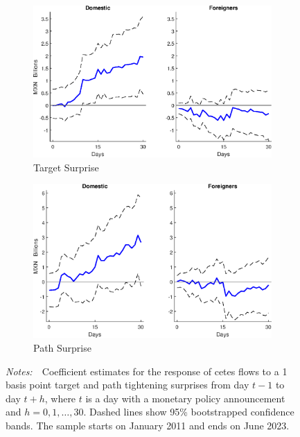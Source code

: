 \documentclass[a4paper, 12pt]{article}
\newcommand{\figtext}[1]{
	\vspace{-1ex}
	\captionsetup{justification=justified,font=footnotesize}
	\caption*{#1}
}
\newcommand{\fignotes}[1]{\figtext{\emph{Notes:~}~#1}}
\providecommand{\lastobsflwbdm}{June 2023}
\providecommand{\idxh}{h}
\begin{document}
\begin{appendices}
	\begin{figure}
		\caption{Cetes Flow Response to Target and Path Surprises by Investor Residence} \label{fig:LPCetesCateg1}
		\begin{center}
			\begin{minipage}{\linewidth}
				\begin{center}
					\begin{subfigure}[b]{0.475\textwidth}
						\centering
						\includegraphics[width=\textwidth]{../Figures/Target11CetesCateg1.eps}
						\caption[]{{\small Target Surprise}} \label{subfig:Target11CetesCateg1}
					\end{subfigure}
					\hfill
					\begin{subfigure}[b]{0.475\textwidth}  
						\centering 
						\includegraphics[width=\textwidth]{../Figures/Path11CetesCateg1.eps}
						\caption[]{{\small Path Surprise}} \label{subfig:Path11CetesCateg1}
					\end{subfigure}
				\end{center}
				\fignotes{Coefficient estimates for the response of cetes flows to a 1 basis point target and path tightening surprises from day \(t - 1\) to day \(t + \idxh\), where \(t\) is a day with a monetary policy announcement and \(\idxh = 0, 1, \ldots, 30\). Dashed lines show 95\% bootstrapped confidence bands. The sample starts on January 2011 and ends on \lastobsflwbdm.}
			\end{minipage} 
		\end{center}
	\end{figure}
	

\end{appendices}
\end{document}
